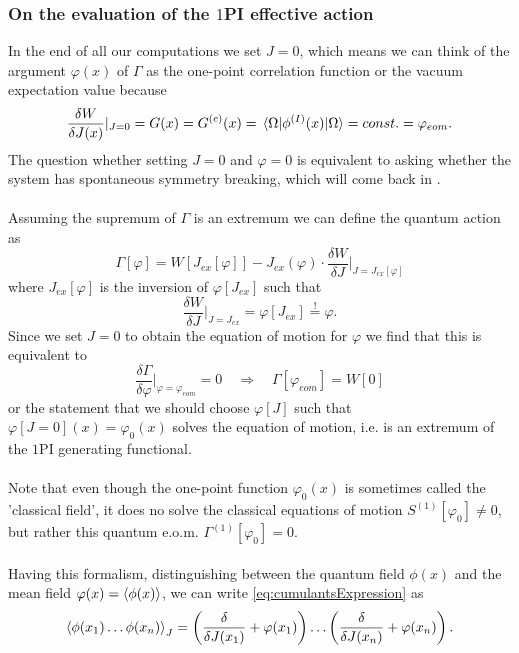  \subsubsection{On the evaluation of the $1$PI effective action}
 In the end of all our computations we set $J=0$, which means we can think of the argument $\varphi(x)$ of $\Gamma$ as the one-point correlation function or the vacuum expectation value because
 \begin{equation}
 \frac{\delta W}{\delta J(x)} |_{J=0} = G(x) = G^{(c)}(x) = \expval{\phi^{(I)}(x)}{\Omega} = const. = \varphi_{eom}.
 \end{equation}
 The question whether setting $J=0$ and $\varphi=0$ is equivalent to asking whether the system has spontaneous symmetry breaking, which will come back in .\\
 \\
 Assuming the supremum of $\Gamma$ is an extremum we can define the quantum action as
 \begin{equation}
 	\Gamma[\varphi] = W[J_{ex}[\varphi]] - J_{ex} (\varphi) \cdot \frac{\delta W}{\delta J} |_{J=J_{ex}[\varphi] }
 \end{equation}
 where $J_{ex}[\varphi]$ is the inversion of $\varphi[J_{ex}]$ such that
 \begin{equation}
 	\frac{\delta W}{\delta J} |_{J=J_{ex}} = \varphi[J_{ex}] \stackrel{!}{=} \varphi.
 \end{equation}
 Since we set $J=0$ to obtain the equation of motion for $\varphi$ we find that this is equivalent to
 \begin{equation}
 \frac{\delta \Gamma}{\delta \varphi}|_{\varphi=\varphi_{eom}} = 0 \quad \Rightarrow \quad \Gamma[\varphi_{eom}] = W[0]
 \end{equation}
 or the statement that we should choose $\varphi[J]$ such that $\varphi[J=0](x)=\varphi_0(x)$ solves the equation of motion, i.e. is an extremum of the $1$PI generating functional.\\
 \\
 Note that even though the one-point function $\varphi_0(x)$ is sometimes called the ’classical field’, it does no solve the classical equations of motion $S^{(1)}[\varphi_0]\neq 0$, but rather this quantum e.o.m. $\Gamma^{(1)}[\varphi_0]=0$.\\
 \\
 Having this formalism, distinguishing between the quantum field $\phi(x)$ and the mean field $\varphi(x)=\expval{\phi(x)}$, we can write \ref{eq:cumulantsExpression} as
 \begin{equation}
 \label{eq:npointcorrelatorViameanfield}
 	\expval{\phi(x_1)\dots \phi(x_n)}_J = \left(\frac{\delta}{\delta J(x_1)} + \varphi(x_1)\right) \dots \left(\frac{\delta}{\delta J(x_n)} + \varphi(x_n)\right).
 \end{equation}
 
